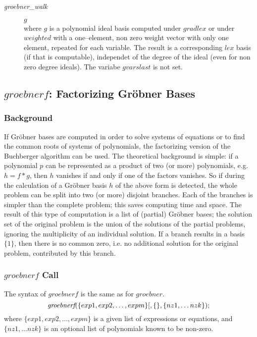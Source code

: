 \begin{description}
\item[{\it groebner\_walk}] $g$\\
where $g$ is a polynomial ideal basis computed under $gradlex$ or under
$weighted$ with a one--element, non zero weight vector with only one
element, repeated for each variable. The result is a corresponding
$lex$ basis (if that is computable), independet of the degree of the
ideal (even for non zero degree ideals).
The variabe $gvarslast$ is not set.
\end{description}

\subsection{$groebnerf$: Factorizing Gr\"obner Bases}

\subsubsection{Background}
If Gr\"obner bases are computed in order to solve systems of
equations or to find the common roots of systems of polynomials,
the factorizing version of the Buchberger algorithm can be used.
The theoretical background is simple: if a polynomial $p$ can be
represented as a product of two (or more) polynomials, e.g. $h= f*g$,
then $h$ vanishes if and only if one of the factors vanishes. So if
during the calculation of a Gr\"obner basis $h$ of the above form is
detected, the whole problem can be split into two (or more)
disjoint branches. Each of the branches is simpler than the complete
problem; this saves computing time and space. The result of this
type of computation is a list of (partial) Gr\"obner bases; the
solution set of the original problem is the union of the solutions of
the partial problems, ignoring the multiplicity of an individual
solution. If a branch results in a basis $\{1\}$, then there is no
common zero, i.e. no additional solution for the original problem,
contributed by this branch.

\subsubsection{$groebnerf$ Call}
The syntax of $groebnerf$ is the same as for $groebner$.
\[ \mbox{\it groebnerf}(\{exp1, exp2, \ldots , expm\}
         [,\{\},\{nz1, \ldots nzk\}); \]
where $\{exp1, exp2, \ldots , expm\} $ is a given list of expressions or
equations, and $\{nz1, \ldots nzk\}$ is
an optional list of polynomials known to be non-zero.

